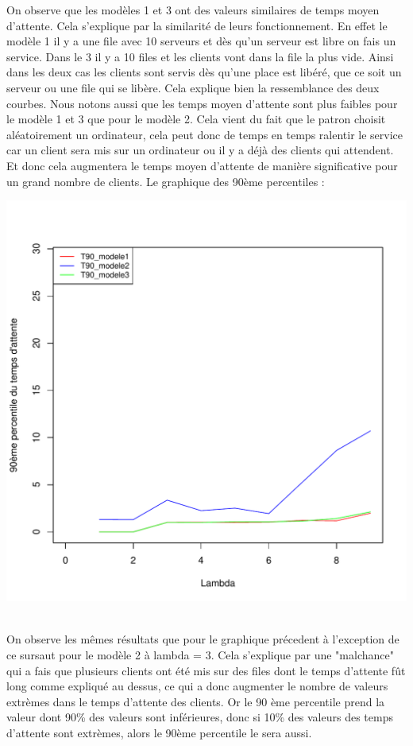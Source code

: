\documentclass[a4paper,11pt]{article}
\begin{document}
	On observe que les modèles 1 et 3 ont des valeurs similaires de temps moyen d'attente. Cela s'explique par la similarité de leurs fonctionnement. En effet le modèle 1
	il y a une file avec 10 serveurs et dès qu'un serveur est libre on fais un service. Dans le 3 il y a 10 files et les clients vont dans la file la plus vide. Ainsi 
	dans les deux cas les clients sont servis dès qu'une place est libéré, que ce soit un serveur ou une file qui se libère. Cela explique bien la ressemblance des deux courbes. 
	Nous notons aussi que les temps moyen d'attente sont plus faibles pour le modèle 1 et 3 que pour le modèle 2. Cela vient du fait que le patron choisit aléatoirement un ordinateur, cela peut donc 
	de temps en temps ralentir le service car un client sera mis sur un ordinateur ou il y a déjà des clients qui attendent. Et donc cela augmentera le temps moyen d'attente de manière
	significative pour un grand nombre de clients.
	\newpage
	Le graphique des 90ème percentiles : \\
	\centerline{\includegraphics[scale=0.8]{t90.pdf}}\\
	
	On observe les mêmes résultats que pour le graphique précedent à l'exception de ce sursaut pour le modèle 2 à lambda = 3. 
	Cela s'explique par une "malchance" qui a fais que plusieurs clients ont été 
	mis sur des files dont le temps d'attente fût long comme expliqué au dessus, ce qui a donc augmenter le nombre de valeurs extrèmes dans le temps d'attente des clients. Or le 90 ème percentile
	prend la valeur dont 90\% des valeurs sont inférieures, donc si 10\% des valeurs des temps d'attente sont extrèmes, alors le 90ème percentile le sera aussi.
\end{document}

